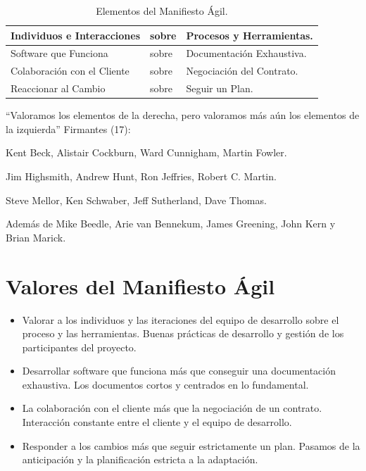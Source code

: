 \documentclass[12pt,twoside,titlepage]{report}
\begin{document}
{\begin{table}[h]
    \begin{center}
        \begin{tabular}{| l | l | l |}
            \hline
            Individuos e Interacciones & sobre & Procesos y Herramientas. \\ \hline
            Software que Funciona & sobre & Documentación Exhaustiva. \\ \hline
            Colaboración con el Cliente & sobre & Negociación del Contrato. \\ \hline
            Reaccionar al Cambio & sobre & Seguir un Plan. \\ \hline
        \end{tabular}
        \caption{Elementos del Manifiesto Ágil.}
        \label{tab:fruta}
    \end{center}
\end{table}

“Valoramos los elementos de la derecha, pero valoramos más aún los elementos de la izquierda”
Firmantes (17):

\begin{compactitem}
    \item Kent Beck, Alistair Cockburn, Ward Cunnigham, Martin Fowler.
    \item Jim Highsmith, Andrew Hunt, Ron Jeffries, Robert C. Martin.
    \item Steve Mellor, Ken Schwaber, Jeff Sutherland, Dave Thomas.
    \item Además de Mike Beedle, Arie van Bennekum, James Greening, John Kern y Brian Marick.
\end{compactitem}

\section{Valores del Manifiesto Ágil}
\begin{itemize}
    \item Valorar a los individuos y las iteraciones del equipo de desarrollo sobre el proceso y las herramientas. Buenas prácticas de desarrollo y gestión de los participantes del proyecto.
    \item Desarrollar software que funciona más que conseguir una documentación exhaustiva. Los documentos cortos y centrados en lo fundamental.
    \item La colaboración con el cliente más que la negociación de un contrato. Interacción constante entre el cliente y el equipo de desarrollo.
    \item Responder a los cambios más que seguir estrictamente un plan. Pasamos de la anticipación y la planificación estricta a la adaptación.
\end{itemize}

}
\end{document}
